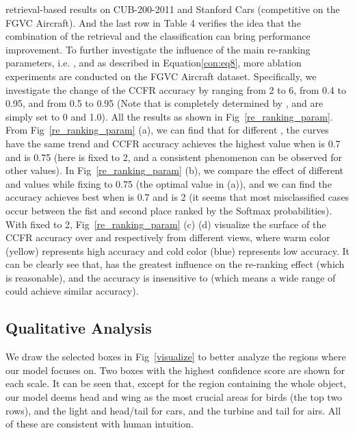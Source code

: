 \documentclass[10pt,twocolumn,letterpaper]{article}
\begin{document}
retrieval-based results on CUB-200-2011 and Stanford Cars (competitive on the FGVC Aircraft). And the last row in Table 4 verifies the idea that the combination of the retrieval and the classification can bring performance improvement. To further investigate the influence of the main re-ranking parameters, i.e. ,  and  as described in Equation\ref{con:eq8}, more ablation experiments are conducted on the FGVC Aircraft dataset. Specifically, we investigate the change of the CCFR accuracy by ranging  from 2 to 6,  from 0.4 to 0.95, and  from 0.5 to 0.95 (Note that  is completely determined by ,  and  are simply set to 0 and 1.0). All the results as shown in Fig~\ref{re_ranking_param}. From Fig~\ref{re_ranking_param} (a), we can find that for different , the curves have the same trend and CCFR accuracy achieves the highest value when  is 0.7 and  is 0.75 (here  is fixed to 2, and a consistent phenomenon can be observed for other  values). In Fig~\ref{re_ranking_param} (b), we compare the effect of different  and  values while fixing  to 0.75 (the optimal value in (a)), and we can find the accuracy achieves best when  is 0.7 and  is 2 (it seems that most misclassified cases occur between the fist and second place ranked by the Softmax probabilities). With  fixed to 2, Fig~\ref{re_ranking_param} (c) (d) visualize the surface of the CCFR accuracy over  and  respectively from different views, where warm color (yellow) represents high accuracy and cold color  (blue) represents low accuracy. It can be clearly see that,  has the greatest influence on the re-ranking effect (which is reasonable), and the accuracy is insensitive to  (which means a wide range of  could achieve similar accuracy).
 
















\subsection{Qualitative Analysis}
We draw the selected boxes in Fig~\ref{visualize} to better analyze the regions where our model focuses on. Two boxes with the highest confidence score are shown for each scale. 
It can be seen that, except for the region containing the whole object, our model deems head and wing as the most crucial areas for birds (the top two rows), and the light and head/tail for cars, and the turbine and tail for airs. All of these are consistent with human intuition.
\end{document}
